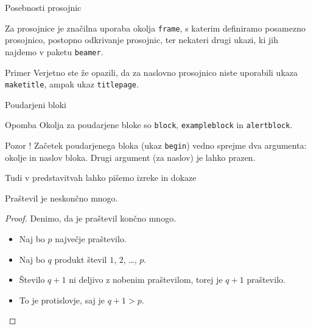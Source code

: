 \begin{frame}{Posebnosti prosojnic}

	Za prosojnice je značilna uporaba okolja \texttt{frame}, s katerim definiramo posamezno prosojnico,
		\pause
		postopno odkrivanje prosojnic,
		\pause
		ter nekateri drugi ukazi, ki jih najdemo v paketu \texttt{beamer}.	\pause
	\begin{exampleblock}{Primer}
		Verjetno ste že opazili, da za naslovno prosojnico niste uporabili
		ukaza \texttt{maketitle}, ampak ukaz \texttt{titlepage}.
	\end{exampleblock}
	
\end{frame}

\begin{frame}{Poudarjeni bloki}
		\begin{block}{Opomba}
			Okolja za poudarjene bloke so \texttt{block}, \texttt{exampleblock} in \texttt{alertblock}.
		\end{block}

		
		\begin{block}{\alert{Pozor !}}
			Začetek poudarjenega bloka (ukaz \texttt{begin}) vedno sprejme 
			dva argumenta: okolje in naslov bloka.
			Drugi argument (za naslov) je lahko prazen. 
		\end{block}

\end{frame}

\begin{frame}{Tudi v predstavitvah lahko pišemo izreke in dokaze}

	\begin{izrek}
	   Praštevil je neskončno mnogo.
	\end{izrek}
	\begin{proof}
	   Denimo, da je praštevil končno mnogo.
	   \begin{itemize}
		  \item <1-> Naj bo \(p\) \alert<4->{največje} praštevilo.
		  \item <2->Naj bo \(q\) produkt števil \(1\), \(2\), \ldots, \(p\).
		  \item <3->Število \(q+1\) ni deljivo z nobenim praštevilom, torej je \(q+1\) praštevilo.
		  \item <4->To je protislovje, saj je \(q+1>p\). \qedhere
	   \end{itemize}
	\end{proof}
 \end{frame}
 
